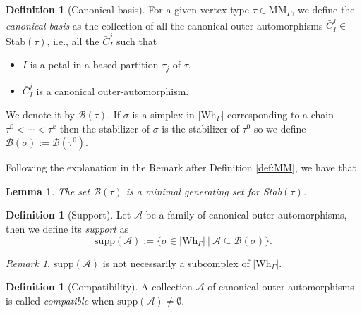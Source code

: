 \documentclass[a4paper]{amsart}
\newcommand{\G}{\Gamma}
\newcommand{\B}{\mathcal{B}}
\newcommand{\au}{\mathcal{A}}
\newcommand{\MM}{\mathrm{MM}}
\newcommand{\Wh}{\mathrm{Wh}}
\newcommand{\supp}{\mathrm{supp}}
\newtheorem{lem}[teo]{Lemma}
\theoremstyle{definition}
\newtheorem{defi}[teo]{Definition}
\theoremstyle{remark}
\newtheorem*{nota}{Remark}
\begin{document}
\begin{defi}[Canonical basis]
    For a given vertex type $\tau\in\MM_\G$, we define the {\sl canonical basis} as the collection of all the canonical outer-automorphisms $\bar{C}^j_I\in$ Stab$(\tau)$, i.e., all the $\bar{C}^j_I$ such that
\begin{itemize}
    \item [1)] $I$ is a petal in a based partition $\tau_j$ of $\tau$.
    \item[2)] $\bar{C}^j_I$ is a canonical outer-automorphism.
\end{itemize}
     We denote it by $\B(\tau)$. If $\sigma$ is a simplex in $|\Wh_\G|$ corresponding to a chain $\tau^0<\cdots<\tau^k$ then the stabilizer of $\sigma$ is the stabilizer of $\tau^0$ so we define $\B(\sigma):=\B(\tau^0)$. 
\end{defi}

Following the explanation in the Remark after Definition \ref{def:MM}, we have that

\begin{lem}
    The set $\B(\tau)$ is a minimal generating set for Stab$(\tau)$. \label{lem:baseGen}
\end{lem}



\begin{defi}[Support]
    Let $\au$ be a family of canonical outer-automorphisms, then we define its {\sl support} as
    $$
\textrm{supp}(\au):=\{\sigma\in |\Wh_\G|\ |\ \au\subseteq \B(\sigma)\}.
    $$
\end{defi}

\begin{nota}
     $\supp(\au)$ is not necessarily a subcomplex of $|\Wh_\G|$.
\end{nota}





\begin{defi}[Compatibility]
    A collection $\au$ of canonical outer-automorphisms is called {\sl compatible} when $\supp(\au)\neq \emptyset$.
\end{defi}
\end{document}

